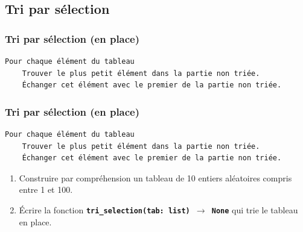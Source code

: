 \documentclass[svgnames,11pt]{beamer}
\begin{document}
\subsection{Tri par sélection}
\begin{frame}[fragile]
    \frametitle{Tri par sélection (en place)}
    \begin{center}
        \begin{lstlisting}[language=Python , basicstyle=\ttfamily\small, xleftmargin=1em, xrightmargin=1em]
Pour chaque élément du tableau
    Trouver le plus petit élément dans la partie non triée.
    Échanger cet élément avec le premier de la partie non triée.
\end{lstlisting}
    \end{center}
    \begin{center}
    \end{center}
\end{frame}
\begin{frame}[fragile]
    \frametitle{Tri par sélection (en place)}
    \begin{center}
        \begin{lstlisting}[language=Python , basicstyle=\ttfamily\small, xleftmargin=1em, xrightmargin=1em]
Pour chaque élément du tableau
    Trouver le plus petit élément dans la partie non triée.
    Échanger cet élément avec le premier de la partie non triée.
\end{lstlisting}
    \end{center}
    \begin{activite}
        \begin{enumerate}
            \item Construire par compréhension un tableau de 10 entiers aléatoires compris entre 1 et 100.
            \item Écrire la fonction \textbf{\texttt{tri\_selection(tab: list) $\rightarrow$ None}} qui trie le tableau en place.
        \end{enumerate}
    \end{activite}
\end{frame}
\end{document}
